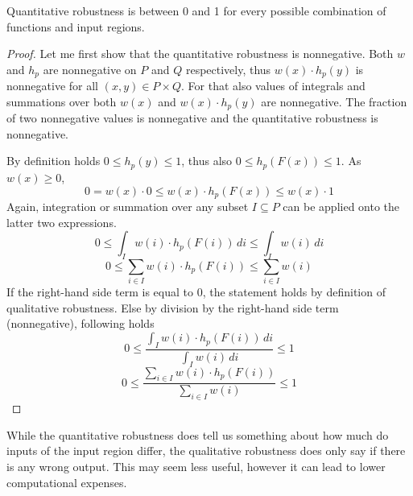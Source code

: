 \begin{lemma}{Quantitative robustness is between 0 and 1 for every possible combination
    of functions and input regions.}
    \begin{proof}
        Let me first show that the quantitative robustness is nonnegative.
        Both $w$ and $h_p$ are nonnegative on $P$ and $Q$ respectively,
        thus $w(x)\cdot h_p(y)$ is nonnegative for all $(x, y)\in P\times Q$.
        For that also values of integrals and summations over both $w(x)$
        and $w(x)\cdot h_p(y)$ are nonnegative.
        The fraction of two nonnegative values is nonnegative
        and the quantitative robustness is nonnegative.

        By definition holds $0 \leq h_p(y) \leq 1$, thus also $0 \leq h_p(F(x)) \leq 1$.
        As $w(x) \geq 0$, 
        \begin{equation*}
            0 = w(x) \cdot 0 \leq w(x) \cdot h_p(F(x)) \leq w(x)\cdot 1
        \end{equation*}
        Again, integration or summation over any subset $I \subseteq P$
        can be applied onto the latter two expressions.
        \begin{equation*}
            0 \leq \int_{I} w(i) \cdot h_p(F(i))\, di \leq \int_{I} w(i)\, di
        \end{equation*}
        \begin{equation*}
            0 \leq \sum_{i\in I} w(i) \cdot h_p(F(i)) \leq \sum_{i\in I} w(i)
        \end{equation*}
        If the right-hand side term is equal to 0,
        the statement holds by definition of qualitative robustness.
        Else by division by the right-hand side term (nonnegative), following holds
        \begin{equation*}
            0 \leq \frac{\int_{I} w(i) \cdot h_p(F(i))\, di}{\int_{I} w(i)\, di} \leq 1
        \end{equation*}
        \begin{equation*}
            0 \leq \frac{\sum_{i\in I} w(i) \cdot h_p(F(i))}{\sum_{i\in I} w(i)} \leq 1
        \end{equation*}
    \end{proof}
\end{lemma}

While the quantitative robustness does tell us something about how much do
inputs of the input region differ,
the qualitative robustness does only say if there is any wrong output.
This may seem less useful, however it can lead to lower computational expenses.

